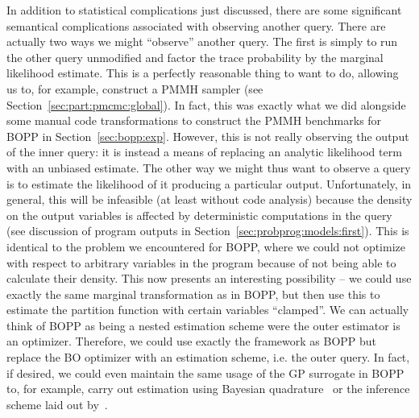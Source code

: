 In addition to statistical complications just discussed,
there are some significant semantical complications associated with observing
another query.  There are actually two ways we might ``observe'' another query.
The first is simply to run the other query unmodified and factor the trace probability
by the marginal likelihood estimate.  This is a perfectly reasonable thing to want to do,
allowing us to, for example, construct a PMMH sampler (see
Section~\ref{sec:part:pmcmc:global}).  In fact, this was exactly what we did alongside
some manual code transformations to
construct the PMMH benchmarks for BOPP in Section~\ref{sec:bopp:exp}.  However,
this is not really observing the output of the inner query: it is instead a means of
replacing an analytic likelihood term with an unbiased estimate.  The other way we might thus
want to observe a query is to estimate the likelihood of it producing a particular output.
Unfortunately, in general, this will be infeasible (at least without code analysis) 
because the density on the output variables is affected by deterministic computations in the query
(see discussion of program outputs in Section~\ref{sec:probprog:models:first}).  
This is identical to the
problem we encountered for BOPP, where we could not optimize with respect to arbitrary
variables in the program because of not being able to calculate their density.
This now presents an interesting possibility -- we could use exactly the same
marginal transformation as in BOPP, but then use this to estimate the partition
function with certain variables ``clamped''.  We can actually think of BOPP as being
a nested estimation scheme were the outer estimator is an optimizer.  Therefore, we
could use exactly the framework as BOPP but replace the BO optimizer
with an estimation scheme, i.e. the outer query.  In fact, if desired, we could even 
maintain the same usage of the GP surrogate in BOPP to, for example, carry out estimation
using Bayesian quadrature~\citep{osborne2012active} or the inference scheme laid out
by~\citep{gutmann2016bayesian}.

